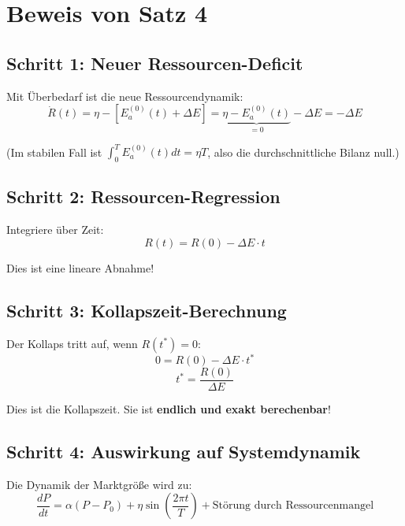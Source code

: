 \documentclass[a4paper,11pt]{report}
\theoremstyle{definition}
\begin{document}
\section{Beweis von Satz 4}

\subsection{Schritt 1: Neuer Ressourcen-Deficit}

Mit Überbedarf ist die neue Ressourcendynamik:
\begin{equation}
    \dot{R}(t) = \eta - [E_a^{(0)}(t) + \Delta E] = \underbrace{\eta - E_a^{(0)}(t)}_{=0} - \Delta E = -\Delta E
\end{equation}

(Im stabilen Fall ist $\int_0^T E_a^{(0)}(t) dt = \eta T$, also die durchschnittliche Bilanz null.)

\subsection{Schritt 2: Ressourcen-Regression}

Integriere über Zeit:
\begin{equation}
    R(t) = R(0) - \Delta E \cdot t
\end{equation}

Dies ist eine lineare Abnahme!

\subsection{Schritt 3: Kollapszeit-Berechnung}

Der Kollaps tritt auf, wenn $R(t^*) = 0$:
\begin{equation}
    0 = R(0) - \Delta E \cdot t^*
\end{equation}
\begin{equation}
    t^* = \frac{R(0)}{\Delta E}
\end{equation}

Dies ist die Kollapszeit. Sie ist \textbf{endlich und exakt berechenbar}!

\subsection{Schritt 4: Auswirkung auf Systemdynamik}

Die Dynamik der Marktgröße wird zu:
\begin{equation}
    \frac{dP}{dt} = \alpha(P - P_0) + \eta \sin\left(\frac{2\pi t}{T}\right) + \text{Störung durch Ressourcenmangel}
\end{equation}
\end{document}
